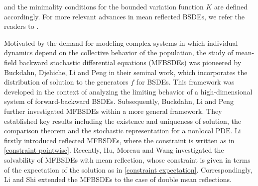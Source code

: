 \documentclass[10pt]{article}%
\numberwithin{equation}{section}
\begin{document}
and the minimality conditions for the bounded variation function $K$ are defined accordingly.  For more relevant advances in mean reflected BSDEs, {we refer the readers to \cite{BH,FS,HHLLW,LW,NQW,QF}.} %

Motivated by the demand for modeling complex systems in which individual dynamics depend on the collective behavior of the population, %
the study of mean-field backward stochastic differential equations (MFBSDEs) was pioneered by Buckdahn, Djehiche, Li and Peng \cite{BDL} in their seminal work, which incorporates the distribution of solution to the generators $f$ for BSDEs. This framework was developed in the context of analyzing the limiting behavior of a high-dimensional system of forward-backward BSDEs. Subsequently, Buckdahn, Li and Peng \cite{BLP} further investigated $\text{MFBSDEs}$ within a more general framework. They established key results including the existence and uniqueness of solution, the comparison theorem and the stochastic representation for a nonlocal $\text{PDE}$. {Li \cite{Li'} firstly introduced reflected MFBSDEs, where the constraint is written as in \eqref{constraint pointwise}. Recently, Hu, Moreau and Wang \cite{HMW}  investigated the solvability of MFBSDEs with mean reflection, whose constraint is given in terms of the expectation of the solution as in \eqref{constraint expectation}. Correspondingly,  Li and Shi \cite{LS} extended the MFBSDEs to the case of double mean reflections.} %
\end{document}

